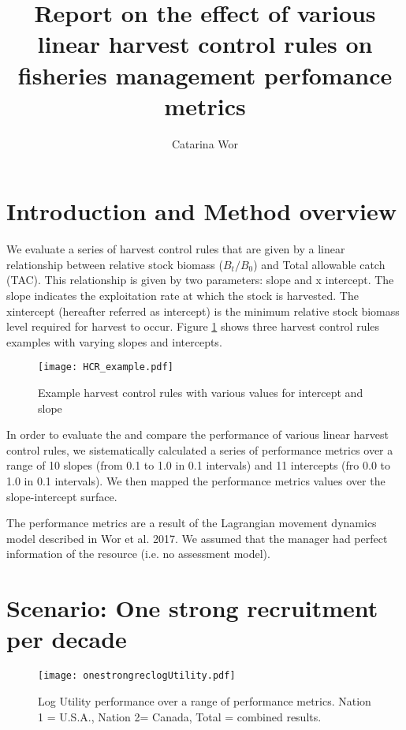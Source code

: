 \documentclass[a4paper]{article}
\title{Report on the effect of various linear harvest control rules on fisheries management perfomance metrics}
\author{Catarina Wor}
\begin{document}
\maketitle \large

\section{Introduction and Method overview}
 
We evaluate a series of harvest control rules that are given by a linear relationship between relative stock biomass ($B_t/B_0$) and Total allowable catch (TAC). This relationship is given by two parameters: slope and  x intercept. The slope indicates the exploitation rate at which the stock is harvested. The xintercept (hereafter referred as intercept) is the minimum relative stock biomass level required for harvest to occur. Figure \ref{examplehcr} shows three harvest control  rules examples with varying slopes and intercepts.


\begin{center} %
\begin{figure}[H]
\centering 
    \label{examplehcr}             
    \texttt{[image: HCR\_example.pdf]}  
    \caption{ Example harvest control rules with various values for intercept and slope}                
\end{figure}
\end{center}


In order to evaluate the and compare the performance of various linear harvest control rules, we sistematically calculated a series of performance metrics over a range of 10 slopes (from 0.1 to 1.0 in 0.1 intervals) and 11 intercepts (fro 0.0 to 1.0 in 0.1 intervals). We then mapped the performance metrics values over the slope-intercept surface. 

The performance metrics are a result of the Lagrangian movement dynamics model described in Wor et al. 2017. We assumed that the manager had perfect information of the resource (i.e. no assessment model). 



\section{Scenario: One strong recruitment per decade}


\begin{center} %
\begin{figure}[H]   
\large           
    \texttt{[image: onestrongreclogUtility.pdf]}  
	\caption{ Log Utility performance over a range of performance metrics. Nation 1 = U.S.A., Nation 2= Canada, Total =  combined results.}                
\end{figure}
\end{center}
\end{document}
